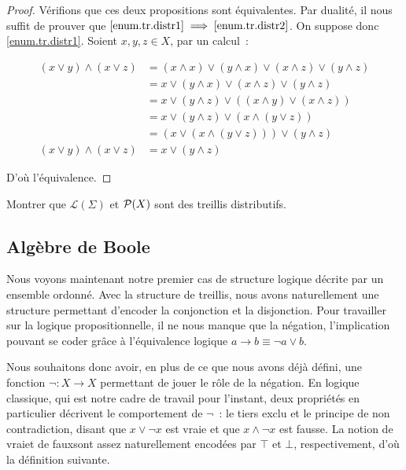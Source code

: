 \begin{proof}
  Vérifions que ces deux propositions sont équivalentes. Par dualité, il nous
  suffit de prouver que $\ref{enum.tr.distr1} \implies\ref{enum.tr.distr2}$.
  On suppose donc \ref{enum.tr.distr1}. Soient $x,y,z\in X$, par un calcul~:

  \begin{align*}
    (x\lor y) \land (x \lor z) &= (x \land x) \lor (y \land x)
    \lor (x \land z) \lor (y \land z)\\
    &= x\lor (y\land x) \lor (x \land z) \lor (y \land z)\\
    &= x\lor (y\land z) \lor ((x\land y)\lor (x\land z))\\
    &= x\lor (y\land z) \lor (x\land (y \lor z))\\
    &= (x\lor (x\land (y \lor z)))\lor (y \land z)\\
    (x\lor y)\land (x\lor z)&= x\lor (y \land z)
  \end{align*}

  D'où l'équivalence.
\end{proof}

\begin{exercise}
  Montrer que $\mathcal L(\Sigma)$ et $\mathcal{P}(X)$ sont des treillis
  distributifs.
\end{exercise}

\subsection{Algèbre de Boole}

Nous voyons maintenant notre premier cas de structure logique décrite par un
ensemble ordonné. Avec la structure de treillis, nous avons naturellement une
structure permettant d'encoder la conjonction et la disjonction. Pour travailler
sur la logique propositionnelle, il ne nous manque que la négation,
l'implication pouvant se coder grâce à l'équivalence logique
$a\to b \equiv \lnot a \lor b$.

Nous souhaitons donc avoir, en plus de ce que nous avons déjà défini, une
fonction $\lnot : X \to X$ permettant de jouer le rôle de la négation. En
logique classique, qui est notre cadre de travail pour l'instant, deux
propriétés en particulier décrivent le comportement de $\lnot$~: le tiers exclu
et le principe de non contradiction, disant que $x\lor \lnot x$ est vraie et que
$x\land \lnot x$ est fausse. La notion de \og vrai\fg et de \og faux\fg sont
assez naturellement encodées par $\top$ et $\bot$, respectivement, d'où la
définition suivante.

